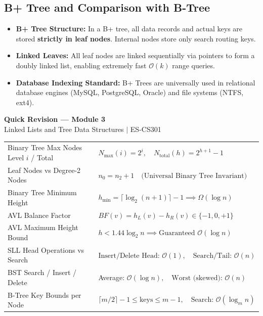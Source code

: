 \documentclass[12pt,a4paper]{article}
\renewcommand{\arraystretch}{1.45}
\begin{document}
\subsection{B+ Tree and Comparison with B-Tree}
\begin{itemize}[leftmargin=*, itemsep=3pt]
  \item \textbf{B+ Tree Structure:} In a B+ tree, all data records and actual keys are stored \textbf{strictly in leaf nodes}. Internal nodes store only search routing keys.
  \item \textbf{Linked Leaves:} All leaf nodes are linked sequentially via pointers to form a doubly linked list, enabling extremely fast $\mathcal{O}(k)$ range queries.
  \item \textbf{Database Indexing Standard:} B+ Trees are universally used in relational database engines (MySQL, PostgreSQL, Oracle) and file systems (NTFS, ext4).
\end{itemize}

\newpage
\begin{center}
  {\large\bfseries\color{myred} Quick Revision --- Module 3}\\[3pt]
  {\small\color{mydark} Linked Lists and Tree Data Structures $|$ ES-CS301}
\end{center}
\noindent{\color{myred}\rule{\linewidth}{1.2pt}}
\vspace{4pt}

\begin{tcolorbox}[formulabox, title={\textbf{Key Formulas, Tree Bounds and Complexity at a Glance}}]
\renewcommand{\arraystretch}{1.25}
\begin{tabularx}{\linewidth}{B{5.0cm} X}
Binary Tree Max Nodes Level $i$ / Total & $N_{\max}(i) = 2^i, \quad N_{\text{total}}(h) = 2^{h+1} - 1$ \\[2pt]
Leaf Nodes vs Degree-2 Nodes & $n_0 = n_2 + 1 \quad \text{(Universal Binary Tree Invariant)}$ \\[2pt]
Binary Tree Minimum Height & $h_{\min} = \lceil \log_2(n+1) \rceil - 1 \implies \Omega(\log n)$ \\[2pt]
AVL Balance Factor & $BF(v) = h_L(v) - h_R(v) \in \{-1, 0, +1\}$ \\[2pt]
AVL Maximum Height Bound & $h < 1.44 \log_2 n \implies \text{Guaranteed } \mathcal{O}(\log n)$ \\[2pt]
SLL Head Operations vs Search & $\text{Insert/Delete Head: } \mathcal{O}(1), \quad \text{Search/Tail: } \mathcal{O}(n)$ \\[2pt]
BST Search / Insert / Delete & Average: $\mathcal{O}(\log n), \quad \text{Worst (skewed): } \mathcal{O}(n)$ \\[2pt]
B-Tree Key Bounds per Node & $\lceil m/2 \rceil - 1 \le \text{keys} \le m - 1, \quad \text{Search: } \mathcal{O}(\log_m n)$ \\[2pt]
\end{tabularx}
\end{tcolorbox}
\end{document}
